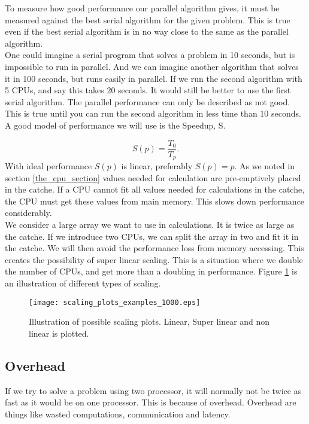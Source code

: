 To measure how good performance our parallel algorithm gives, it must be measured against the best serial algorithm for the given problem. This is true even if the best serial algorithm is in no way close to the same as the parallel algorithm. \\

One could imagine a serial program that solves a problem in 10 seconds, but is impossible to run in parallel. And we can imagine another algorithm that solves it in 100 seconds, but runs easily in parallel. If we run the second algorithm with 5 CPUs, and say this takes 20 seconds. It would still be better to use the first serial algorithm. The parallel performance can only be described as not good. This is true until you can run the second algorithm in less time than 10 seconds. \\

A good model of performance we will use is the Speedup, S.

\begin{equation}
S(p) = \frac{T_0}{T_p} .
\end{equation}
With ideal performance $S(p)$ is linear, preferably $S(p) = p$. As we noted in section \ref{the_cpu_section} values needed for calculation are pre-emptively placed in the catche. If a CPU cannot fit all values needed for calculations in the catche, the CPU must get these values from main memory. This slows down performance considerably. \\

We consider a large array we want to use in calculations. It is twice as large as the catche. If we introduce two CPUs, we can split the array in two and fit it in the catche. We will then avoid the performance loss from memory accessing. This creates the possibility of super linear scaling. This is a situation where we double the number of CPUs, and get more than a doubling in performance. Figure \ref{super_linear_scaling} is an illustration of different types of scaling.

\begin{figure}[ht!]
\centering
\texttt{[image: scaling\_plots\_examples\_1000.eps]}
\caption{Illustration of possible scaling plots. Linear, Super linear and non linear is plotted.}
\label{super_linear_scaling}
\end{figure}

\subsection{Overhead}
If we try to solve a problem using two processor, it will normally not be twice as fast as it would be on one processor. This is because of overhead. Overhead are things like wasted computations, communication and latency. \\

